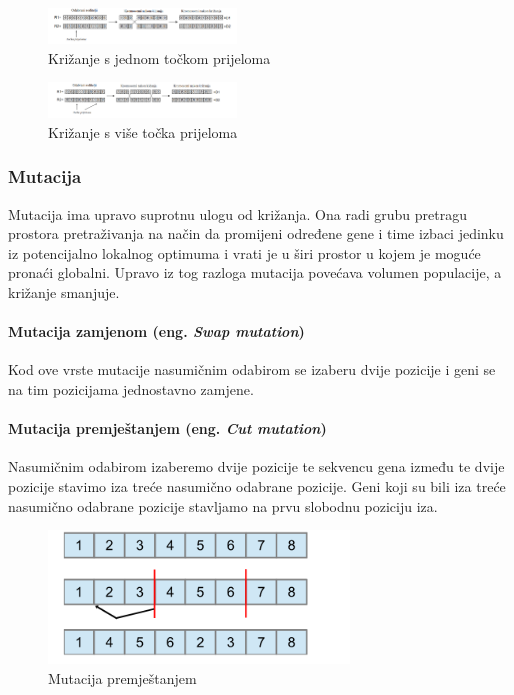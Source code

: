 \documentclass[times, utf8, zavrsni]{fer}
\begin{document}
\begin{figure}[!htb]
	\centering
	\includegraphics[width=5cm]{slike/crossOnePoint.png}
	\caption{Križanje s jednom točkom prijeloma}
	\label{fig:one-cross}
\end{figure}

\begin{figure}[!htb]
	\centering
	\includegraphics[width=5cm]{slike/crossTPoint.png}
	\caption{Križanje s više točka prijeloma}
	\label{fig:t-crosses}
\end{figure}

\subsubsection{Mutacija}

Mutacija ima upravo suprotnu ulogu od križanja. Ona radi grubu pretragu prostora pretraživanja na način da promijeni određene gene i time izbaci jedinku iz potencijalno lokalnog optimuma i vrati je u širi prostor u kojem je moguće pronaći globalni. Upravo iz tog razloga mutacija povećava volumen populacije, a križanje smanjuje. 

\paragraph{Mutacija zamjenom (eng. \emph{Swap mutation})}
\label{SwapMutation}
Kod ove vrste mutacije nasumičnim odabirom se izaberu dvije pozicije i geni se na tim pozicijama jednostavno zamjene.

\paragraph{Mutacija premještanjem (eng. \emph{Cut mutation})}
Nasumičnim odabirom izaberemo dvije pozicije te sekvencu gena između te dvije pozicije stavimo iza treće nasumično odabrane pozicije. Geni koji su bili iza treće nasumično odabrane pozicije stavljamo na prvu slobodnu poziciju iza.

\begin{figure}[!htb]
	\centering
	\includegraphics[width=8cm]{slike/cutMutation.png}
	\caption{Mutacija premještanjem}
	\label{fig:cut-mutation}
\end{figure}
\end{document}
